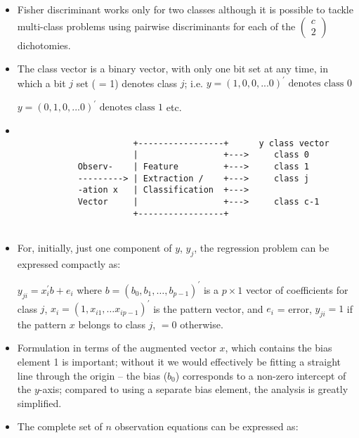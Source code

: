 \documentclass[a4,dvips]{seminar}
\newcommand{\heading}[1]{%
  \begin{center}
    \large\bf
    \shadowbox{#1}%
  \end{center}
  \vspace{1ex minus 1ex}}
\begin{document}
\begin{slide}
\textcolor {reddish} {\heading{Mean Square Error Discriminant}}
\begin{itemize}
\item Fisher discriminant works only for two classes although 
it is possible to tackle multi-class problems using
pairwise discriminants for each of the $ \left( 
\begin{array}{l}
c \\
2
\end{array}
\right) $
 dichotomies. 
\item The class vector is a binary vector, with only one bit set at any
time, in which a bit $j$ set ( = 1) denotes class $j$; i.e. 
$      y     = (1,0,0,...0)^\prime \mbox{   denotes class 0} $

$      y     = (0,1,0,...0)^\prime \mbox{   denotes class 1} $
etc.
\item 
\begin{footnotesize}
\begin{verbatim}
 
                       +-----------------+      y class vector
                       |                 +--->     class 0
            Observ-    | Feature         +--->     class 1
            ---------> | Extraction /    +--->     class j
            -ation x   | Classification  +--->
            Vector     |                 +--->     class c-1
                       +-----------------+  
 
\end{verbatim}
\end{footnotesize}
\item For, initially, just one component of $y$, $y_j$, the regression problem
can be expressed compactly as:

$     y_{ji}  = x_i^\prime b + e_i $       
      where $b = (b_0, b_1, \dots , b_{p-1})^\prime$ 
is a $p \times 1$ vector of coefficients for class $j$,
            $x_i = (1, x_{i1}, \dots x_{ip-1})^\prime$ 
is the pattern vector, and             $e_i$ = error,
            $y_{ji} = 1$ if the pattern $x$ belongs to class $j$,
                $= 0$ otherwise.
\item  Formulation in terms of the augmented vector $x$, which contains the
bias element 1 is important; without it we would effectively be
fitting a straight line through the origin -- the bias ($b_0$)
corresponds to a non-zero intercept of the $y$-axis; compared to using
a separate bias element, the analysis is greatly simplified.
\item The complete set of $n$ observation equations can be expressed as:
 

\end{itemize}
\end{slide}
\end{document}
